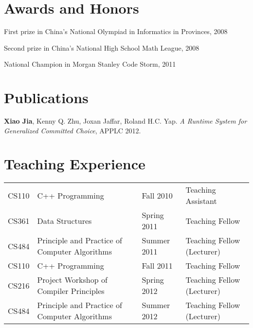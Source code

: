 \documentclass[letterpaper]{article}
\renewenvironment{itemize}{
  \begin{list}{}{
    \setlength{\leftmargin}{1.5em}
    \vspace{-1mm}
  }
}{
  \end{list}
}
\begin{document}
\vspace{-7mm}
\section*{Awards and Honors}

\begin{itemize}
  \item First prize in China's National Olympiad in Informatics in Provinces, 2008
  \item Second prize in China's National High School Math League, 2008
  \item National Champion in Morgan Stanley Code Storm, 2011
\end{itemize}


\vspace{-7mm}
\section*{Publications}

\begin{itemize}
  \item \textbf{Xiao Jia}, Kenny Q. Zhu, Joxan Jaffar, Roland H.C. Yap. \emph{A Runtime System for Generalized Committed Choice}, APPLC 2012.
\end{itemize}


\vspace{-7mm}
\section*{Teaching Experience}

\vspace{-1mm}
\begin{tabular}{clll}
  CS110 & C++ Programming & Fall 2010 & Teaching Assistant \\
  CS361 & Data Structures & Spring 2011 & Teaching Fellow \\
  CS484 & Principle and Practice of Computer Algorithms & Summer 2011 & Teaching Fellow (Lecturer) \\
  CS110 & C++ Programming & Fall 2011 & Teaching Fellow \\
  CS216 & Project Workshop of Compiler Principles & Spring 2012 & Teaching Fellow (Lecturer) \\
  CS484 & Principle and Practice of Computer Algorithms & Summer 2012 & Teaching Fellow (Lecturer)
\end{tabular}


\vspace{-2mm}
\end{document}
